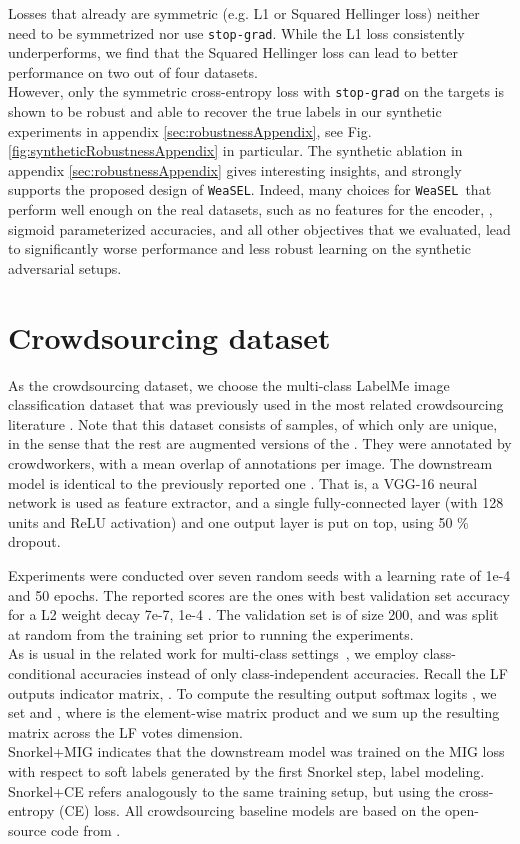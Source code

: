 \documentclass{article}
\newcommand{\weasel}{\texttt{WeaSEL}}\newcommand{\brackets}[1]{\left( #1 \right)}
\begin{document}
Losses that already are symmetric (e.g. L1 or Squared Hellinger loss) neither need to be symmetrized nor use \texttt{stop-grad}. While the L1 loss consistently underperforms, we find that the Squared Hellinger loss can lead to better performance on two out of four datasets.
\\
However, only the symmetric cross-entropy loss with \texttt{stop-grad} on the targets is shown to be robust and able to recover the true labels in our synthetic experiments in appendix \ref{sec:robustnessAppendix}, see Fig. \ref{fig:syntheticRobustnessAppendix} in particular. 
The synthetic ablation in appendix \ref{sec:robustnessAppendix} gives interesting insights, and strongly supports the proposed design of \weasel. Indeed, many choices for \weasel\ that perform well enough on the real datasets, such as no features for the encoder, , sigmoid parameterized accuracies, and all other objectives that we evaluated, lead to significantly worse performance and less robust learning on the synthetic adversarial setups.


\section{Crowdsourcing dataset} \label{sec:crowdsourcingAppendix}
As the crowdsourcing dataset, we choose the multi-class LabelMe image classification dataset that was previously used in the most related crowdsourcing literature \cite{rodrigues2018deep, MaxMIG}.
Note that this dataset consists of  samples, of which only  are unique, in the sense that the rest are augmented versions of the . They were annotated by  crowdworkers, with a mean overlap of  annotations per image.
The downstream model is identical to the previously reported one \cite{rodrigues2018deep, MaxMIG}. That is, a VGG-16 neural network is used as feature extractor, and a single fully-connected layer (with 128 units and ReLU activation) and
one output layer is put on top, using 50 \% dropout.

Experiments were conducted over seven random seeds with a learning rate of 1e-4 and 50 epochs. The reported scores are the ones with best validation set accuracy for a L2 weight decay  7e-7, 1e-4 . The validation set is of size 200, and was split at random from the training set prior to running the experiments.
\\
As is usual in the related work for multi-class settings~\cite{Snorkel}, we employ class-conditional accuracies  instead of only  class-independent accuracies. Recall the LF outputs indicator matrix,
. To compute the resulting output softmax logits , we set  and , where  is the element-wise matrix product and we sum up the resulting matrix  across the LF votes dimension.
\\
Snorkel+MIG indicates that the downstream model  was trained on the MIG loss with respect to soft labels generated by the first Snorkel step, label modeling. Snorkel+CE refers analogously to the same training setup, but using the cross-entropy (CE) loss.
All crowdsourcing baseline models are based on the open-source code from \cite{MaxMIG}.
\end{document}
